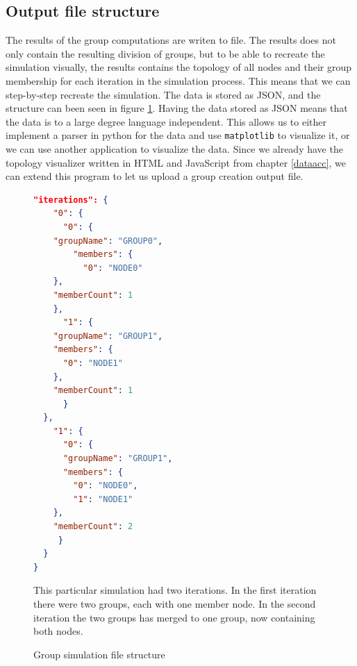 \subsection{Output file structure}
The results of the group computations are writen to file. The results does not only contain the resulting division of groups, but to be able to recreate the simulation
visually, the results contains the topology of all nodes and their group membership for each iteration in the simulation process. This means that we can step-by-step
recreate the simulation. The data is stored as JSON, and the structure can been seen in figure \ref{fig:jsongroup}.
Having the data stored as JSON means that the data is to a large degree language independent.
This allows us to either implement a parser in python for the data and use \verb|matplotlib| to visualize it,
or we can use another application to visualize the data. Since we already have the topology visualizer
written in HTML and JavaScript from chapter \ref{dataacc}, we can extend this program to let us upload a group creation output file. 
		\begin{figure}[t!]

\begin{minipage}{\linewidth}
\begin{lstlisting}[language=json]
  "iterations": {
    "0": {
      "0": {
	"groupName": "GROUP0",
        "members": {
          "0": "NODE0"
	},
	"memberCount": 1
    },
      "1": {
	"groupName": "GROUP1",
	"members": {
	  "0": "NODE1"
	},
	"memberCount": 1
      }
  },
    "1": {
      "0": {
	  "groupName": "GROUP1",
	  "members": {
	    "0": "NODE0",
	    "1": "NODE1"
	},
	"memberCount": 2
     }
  }
}
\end{lstlisting}
\end{minipage}

\caption{Group simulation file structure}
\medskip
\small
This particular simulation had two iterations. In the first iteration there were two groups, each with one member node. In the second iteration the two groups has merged to one group, now
containing both nodes. 
\label{fig:jsongroup}
\end{figure}




